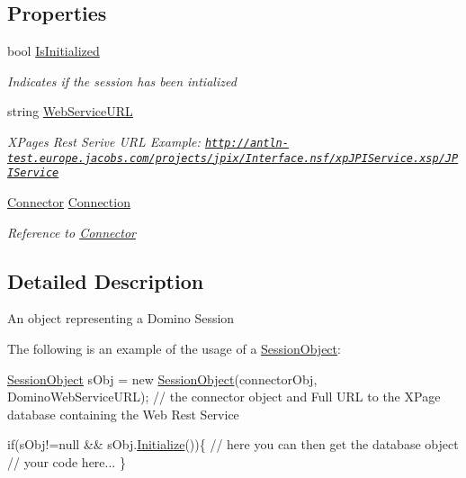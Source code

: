 \subsection*{Properties}
\begin{DoxyCompactItemize}
\item 
bool \hyperlink{class_session_object_ae0885b9054fc3ce287307ac16ff69990}{Is\+Initialized}
\begin{DoxyCompactList}\small\item\em Indicates if the session has been intialized \end{DoxyCompactList}\item 
string \hyperlink{class_session_object_a697c071c812fbf7ad1166b896fb44c16}{Web\+Service\+U\+RL}
\begin{DoxyCompactList}\small\item\em X\+Pages Rest Serive U\+RL Example\+: \href{http://antln-test.europe.jacobs.com/projects/jpix/Interface.nsf/xpJPIService.xsp/JPIService}{\tt http\+://antln-\/test.\+europe.\+jacobs.\+com/projects/jpix/\+Interface.\+nsf/xp\+J\+P\+I\+Service.\+xsp/\+J\+P\+I\+Service} \end{DoxyCompactList}\item 
\hyperlink{class_connector}{Connector} \hyperlink{class_session_object_a014bdbf705a753540e19bfb53030c55c}{Connection}
\begin{DoxyCompactList}\small\item\em Reference to \hyperlink{class_connector}{Connector} \end{DoxyCompactList}\end{DoxyCompactItemize}


\subsection{Detailed Description}
An object representing a Domino Session 

The following is an example of the usage of a {\ttfamily \hyperlink{class_session_object}{Session\+Object}}\+: 
\begin{DoxyCode}
\hyperlink{class_session_object}{SessionObject} sObj = \textcolor{keyword}{new} \hyperlink{class_session_object_a173822a7aec467880195d79a1bc9f520}{SessionObject}(connectorObj, DominoWebServiceURL); \textcolor{comment}{// the
       connector object and Full URL to the XPage database containing the Web Rest Service}

\textcolor{keywordflow}{if}(sObj!=null && sObj.\hyperlink{class_session_object_af3b9c9d56d98c848061952ed935f815b}{Initialize}())\{
     \textcolor{comment}{// here you can then get the database object}
     \textcolor{comment}{// your code here... }
\}
\end{DoxyCode}
 

